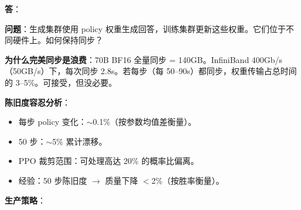 \begin{questionbox}
\textbf{答}：

\textbf{问题}：生成集群使用 policy 权重生成回答，训练集群更新这些权重。它们位于不同硬件上。如何保持同步？

\textbf{为什么完美同步是浪费}：70B BF16 全量同步 = 140GB。InfiniBand 400Gb/s（50GB/s）下，每次同步 2.8s。若每步（每 50--90s）都同步，权重传输占总时间的 3--5\%。可接受，但没必要。

\textbf{陈旧度容忍分析}：

\begin{itemize}
  \item 每步 policy 变化：$\sim$0.1\%（按参数均值差衡量）。
  \item 50 步：$\sim$5\% 累计漂移。
  \item PPO 裁剪范围：可处理高达 20\% 的概率比偏离。
  \item 经验：50 步陈旧度 $\rightarrow$ 质量下降 $<$2\%（按胜率衡量）。
\end{itemize}

\textbf{生产策略}：


\end{questionbox}

